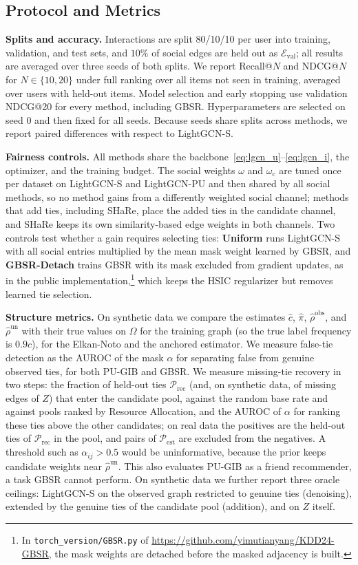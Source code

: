 \documentclass[sigconf]{acmart}
\begin{document}
\subsection{Protocol and Metrics}
\label{sec:protocol}
\textbf{Splits and accuracy.} Interactions are split 80/10/10 per user into training, validation, and test sets, and $10\%$ of social edges are held out as $\mathcal{E}_{\text{val}}$; all results are averaged over three seeds of both splits. We report Recall@$N$ and NDCG@$N$ for $N \in \{10, 20\}$ under full ranking over all items not seen in training, averaged over users with held-out items. Model selection and early stopping use validation NDCG@20 for every method, including GBSR. Hyperparameters are selected on seed 0 and then fixed for all seeds. Because seeds share splits across methods, we report paired differences with respect to LightGCN-S.

\textbf{Fairness controls.} All methods share the backbone~\eqref{eq:lgcn_u}--\eqref{eq:lgcn_i}, the optimizer, and the training budget. The social weights $\omega$ and $\omega_{\text{c}}$ are tuned once per dataset on LightGCN-S and LightGCN-PU and then shared by all social methods, so no method gains from a differently weighted social channel; methods that add ties, including SHaRe, place the added ties in the candidate channel, and SHaRe keeps its own similarity-based edge weights in both channels. Two controls test whether a gain requires selecting ties: \textbf{Uniform} runs LightGCN-S with all social entries multiplied by the mean mask weight learned by GBSR, and \textbf{GBSR-Detach} trains GBSR with its mask excluded from gradient updates, as in the public implementation,\footnote{In \texttt{torch\_version/GBSR.py} of \url{https://github.com/yimutianyang/KDD24-GBSR}, the mask weights are detached before the masked adjacency is built.} which keeps the HSIC regularizer but removes learned tie selection.

\textbf{Structure metrics.} On synthetic data we compare the estimates $\hat{c}$, $\hat{\pi}$, $\hat{\rho}^{\text{obs}}$, and $\hat{\rho}^{\text{un}}$ with their true values on $\Omega$ for the training graph (so the true label frequency is $0.9c$), for the Elkan-Noto and the anchored estimator. We measure false-tie detection as the AUROC of the mask $\alpha$ for separating false from genuine observed ties, for both PU-GIB and GBSR. We measure missing-tie recovery in two steps: the fraction of held-out ties $\mathcal{P}_{\text{rec}}$ (and, on synthetic data, of missing edges of $Z$) that enter the candidate pool, against the random base rate and against pools ranked by Resource Allocation, and the AUROC of $\alpha$ for ranking these ties above the other candidates; on real data the positives are the held-out ties of $\mathcal{P}_{\text{rec}}$ in the pool, and pairs of $\mathcal{P}_{\text{est}}$ are excluded from the negatives. A threshold such as $\alpha_{ij} > 0.5$ would be uninformative, because the prior keeps candidate weights near $\hat{\rho}^{\text{un}}$. This also evaluates PU-GIB as a friend recommender, a task GBSR cannot perform. On synthetic data we further report three oracle ceilings: LightGCN-S on the observed graph restricted to genuine ties (denoising), extended by the genuine ties of the candidate pool (addition), and on $Z$ itself.
\end{document}

